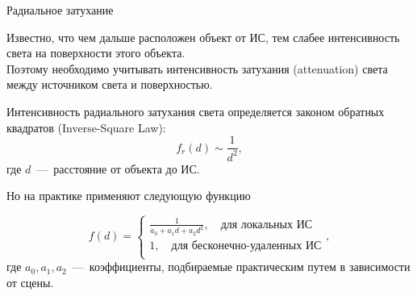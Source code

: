 \documentclass{beamer}
\begin{document}
	\begin{frame}{Радиальное затухание}

		Известно, что чем дальше расположен объект от ИС, тем слабее интенсивность света на поверхности этого объекта.\\
		Поэтому необходимо учитывать интенсивность затухания (attenuation) света между источником света и поверхностью.

		\vspace{.2cm}		
		Интенсивность радиального затухания света определяется законом обратных квадратов (Inverse-Square Law):
		\[
			f_r(d) \sim \frac{1}{d^2}
			,
		\]
		где $d$~---~расстояние от объекта до ИС.
		
		Но на практике применяют следующую функцию
			
		\[
			f(d) = 
			\begin{cases}
				\frac{1}{a_0+a_1 d + a_2 d^2}, \quad \text{для локальных ИС} \\	
				1, \quad \text{для бесконечно-удаленных ИС} \\	
			\end{cases}	
			,
		\]
		где $a_0, a_1, a_2$~---~коэффициенты, подбираемые практическим путем в зависимости от сцены.


	\end{frame}
\end{document}
